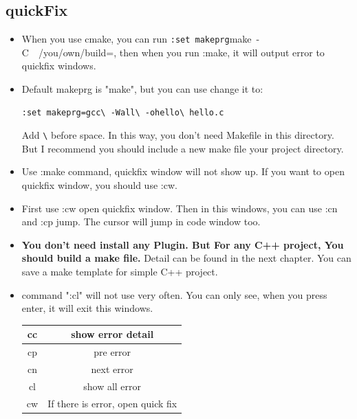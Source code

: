 \documentclass[a4paper,11pt,twoside]{book}
\begin{document}
\subsection{quickFix}
\begin{itemize}
		\item When you use cmake, you can run \verb=:set makeprg=make\ -C\ ~/you/own/build=, then when you run :make, it will output error to quickfix windows.


		\item Default makeprg is "make", but you can use change it to: 

\begin{verbatim}
:set makeprg=gcc\ -Wall\ -ohello\ hello.c 
\end{verbatim}
Add \verb=\= before space. In this way, you don't need Makefile in this directory. But I recommend you should include a new make file your project directory.

		\item Use :make command, quickfix window will not show up. If you want to open quickfix window, you should use :cw. 

		\item First use :cw open quickfix window. Then in this windows, you can use :cn and :cp jump. The cursor will jump in code window  too. 

		\item \textbf{You don't need install any Plugin. But For any C++ project, You should build a make file.} Detail can be found in the next chapter.  You can save a make template for simple C++ project. 

		\item command ":cl" will not use very often. You can only see, when you press enter, it will exit this windows. 

\begin{tabular}{c|c}
\hline
cc  &    show error detail \\
\hline
cp  &     pre error \\ 
\hline
cn &   next error\\ 
\hline
cl &     show all error\\
\hline
cw &    If there is error, open quick fix \\ 
\end{tabular}

\end{itemize}
\end{document}
